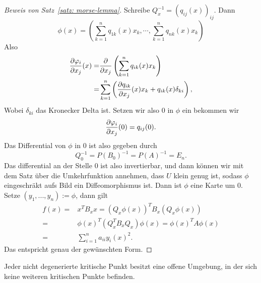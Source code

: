 \begin{proof}[Beweis von Satz~\ref{satz: morse-lemma}]
    Schreibe $Q_x^{-1} = (q_{ij}(x))_{ij}$. Dann
    \[ \phi(x) = \left( 
        \sum_{k = 1}^n q_{1k}(x) x_k, \cdots , \sum_{k = 1}^n q_{nk}(x) x_k
        \right)
    \]
    Also 
    \begin{align*}
        \pderive[\phi_i]{x_j} (x) 
            = & \pderive{x_j} \left( \sum_{k = 1}^n q_{ik} (x) x_k \right) \\
        = & \sum_{k = 1}^n \left( 
            \pderive[q_{ik}]{x_j}(x) x_k + q_{ik}(x) \delta_{ki}
        \right)
    , \end{align*}
    Wobei $\delta_{ki}$ das Kronecker Delta ist. Setzen wir also $0$  in $\phi$ ein
    bekommen wir
    \[ \pderive[\phi_i]{x_j}(0) = q_{ij}(0). \]
    Das Differential von $\phi$ in $0$ ist also gegeben durch
    \[ Q_0^{-1} = P(B_0)^{-1} = P(A)^{-1} = E_n . \]
    Das differential an der Stelle $0$ ist also invertierbar, und dann können wir mit dem 
    Satz über die Umkehrfunktion annehmen, dass $U$ klein genug ist, sodass $\phi$ 
    eingeschräkt aufs Bild ein Diffeomorphismus ist. 
    Dann ist $\phi$ eine Karte um $0$. Setze $(y_1, ..., y_n) := \phi$, dann gilt 
    \begin{align*}
        f(x) = & x^T B_x x 
            = (Q_x \phi(x))^T B_x (Q_x \phi(x)) \\
        = & \phi(x)^T (Q_x^T B_x Q_x) \phi(x) 
            = \phi(x)^T A \phi(x) \\
        = & \sum_{i = 1}^n a_{ii} y_i(x)^2
    . \end{align*}
    Das entspricht genau der gewünschten Form.
\end{proof}

\begin{corollary}
    Jeder nicht degenerierte kritische Punkt besitzt eine offene Umgebung, in der sich keine weiteren
    kritischen Punkte befinden.
\end{corollary}
